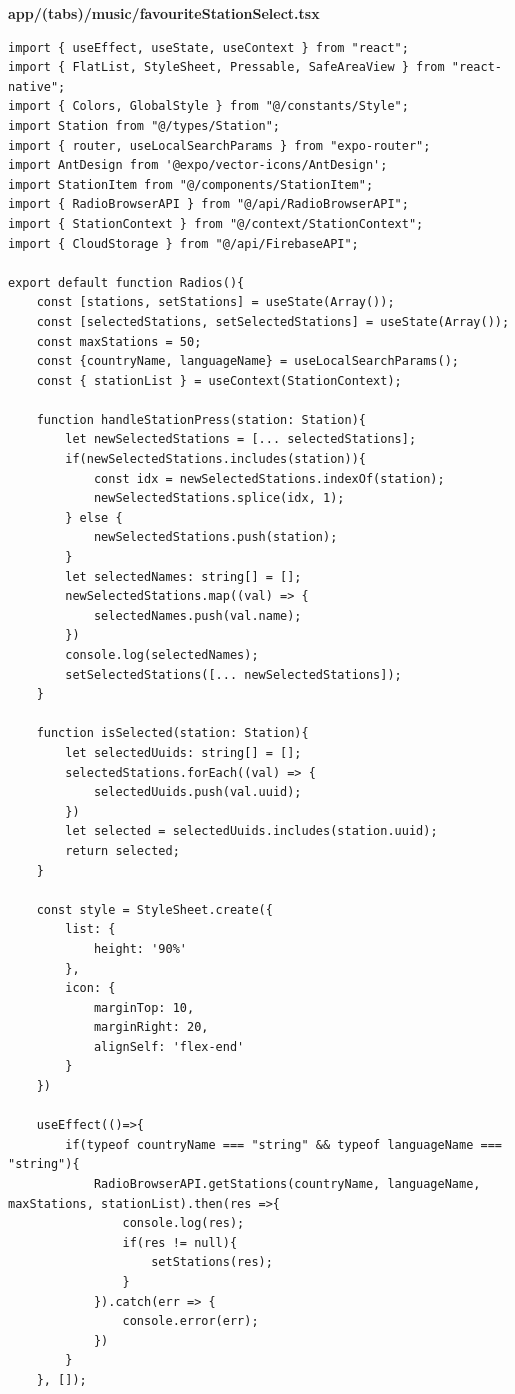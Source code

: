 \documentclass[11pt, twoside]{article}
\begin{document}
\textbf{app/(tabs)/music/favouriteStationSelect.tsx}
\begin{lstlisting}
import { useEffect, useState, useContext } from "react";
import { FlatList, StyleSheet, Pressable, SafeAreaView } from "react-native";
import { Colors, GlobalStyle } from "@/constants/Style";
import Station from "@/types/Station";
import { router, useLocalSearchParams } from "expo-router";
import AntDesign from '@expo/vector-icons/AntDesign';
import StationItem from "@/components/StationItem";
import { RadioBrowserAPI } from "@/api/RadioBrowserAPI";
import { StationContext } from "@/context/StationContext";
import { CloudStorage } from "@/api/FirebaseAPI";

export default function Radios(){
    const [stations, setStations] = useState(Array());
    const [selectedStations, setSelectedStations] = useState(Array());
    const maxStations = 50;
    const {countryName, languageName} = useLocalSearchParams();
    const { stationList } = useContext(StationContext);

    function handleStationPress(station: Station){
        let newSelectedStations = [... selectedStations];
        if(newSelectedStations.includes(station)){ 
            const idx = newSelectedStations.indexOf(station);
            newSelectedStations.splice(idx, 1);
        } else {
            newSelectedStations.push(station);
        }
        let selectedNames: string[] = [];
        newSelectedStations.map((val) => {
            selectedNames.push(val.name);
        })
        console.log(selectedNames);
        setSelectedStations([... newSelectedStations]);
    }

    function isSelected(station: Station){
        let selectedUuids: string[] = [];
        selectedStations.forEach((val) => {
            selectedUuids.push(val.uuid);
        })
        let selected = selectedUuids.includes(station.uuid);
        return selected; 
    }

    const style = StyleSheet.create({
        list: {
            height: '90%'
        },
        icon: {
            marginTop: 10,
            marginRight: 20,
            alignSelf: 'flex-end'
        }
    })

    useEffect(()=>{
        if(typeof countryName === "string" && typeof languageName === "string"){
            RadioBrowserAPI.getStations(countryName, languageName, maxStations, stationList).then(res =>{
                console.log(res);
                if(res != null){
                    setStations(res);
                }
            }).catch(err => {
                console.error(err);
            })
        }
    }, []);


\end{lstlisting}
\end{document}
